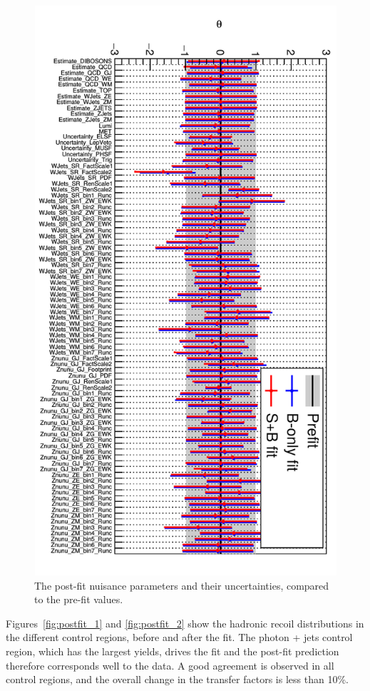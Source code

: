 \begin{figure}[p]
  \centering
 \includegraphics[width=.8\textwidth]{nuisance.png} 
 \caption{The post-fit nuisance parameters and their uncertainties, compared to the pre-fit values.}
 \label{fig:nuisance}
\end{figure}

Figures~\ref{fig:postfit_1} and \ref{fig:postfit_2} show the hadronic recoil distributions in the different control regions, before and after the fit. The photon + jets control region, which has the largest yields, drives the fit and the post-fit prediction therefore corresponds well to the data. A good agreement is observed in all control regions, and the overall change in the transfer factors is less than 10\%.


